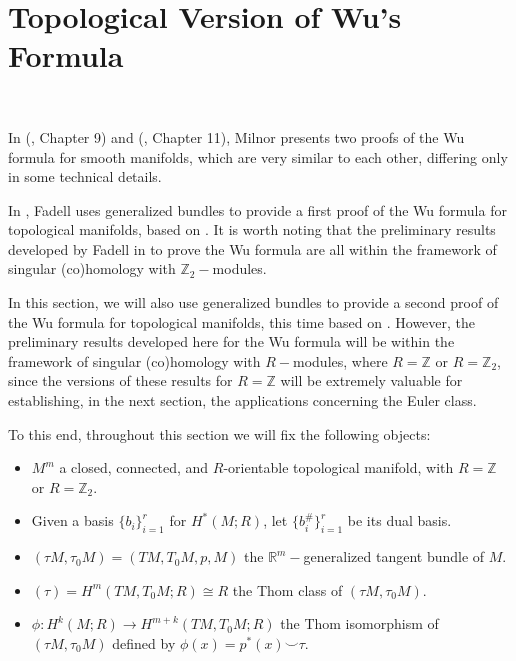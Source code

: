 \documentclass[12pt,oneside]{book}
\newcommand{\R}{\mathbb{R}}
\newcommand{\Z}{\mathbb{Z}}
\newcommand{\ccup}{\smile}
\begin{document}
    \section{Topological Version of Wu's Formula}\label{sec_form_wu}

    \

    In (\cite{milnor_2}, Chapter 9) and (\cite{milnor_1}, Chapter 11), Milnor presents two proofs of the Wu formula for 
    smooth manifolds, which are very similar to each other, differing only in some technical details.

    In \cite{fadell_1}, Fadell uses generalized bundles to provide a first proof of the Wu formula for topological 
    manifolds, based on \cite{milnor_2}. It is worth noting that the preliminary results developed by Fadell 
    in \cite{fadell_1} to prove the Wu formula are all within the framework of singular (co)homology with 
    $\Z_{2}-$modules.

    In this section, we will also use generalized bundles to provide a second proof of the Wu formula for topological manifolds, this time 
    based on \cite{milnor_1}. However, the preliminary results developed here for the Wu formula will be within the framework of singular 
    (co)homology with $R-$modules, where $R=\Z$ or $R=\Z_{2}$, since the versions of these results for $R=\Z$ will be extremely valuable for 
    establishing, in the next section, the applications concerning the Euler class.

    To this end, throughout this section we will fix the following objects:

    \begin{itemize}
    	\item $M^{m}$ a closed, connected, and $R$-orientable topological manifold, with $R=\Z$ or $R=\Z_{2}$.
    	\item Given a basis $\{b_{i}\}_{i=1}^{r}$ for $H^{*}(M;R)$, let $\{b_{i}^{\#}\}_{i=1}^{r}$ be its dual basis.
    	\item $(\tau M,\tau_{0}M)=(TM,T_{0}M,p,M)$ the $\R^{m}-$generalized tangent bundle of $M$.
    	\item $(\tau)=H^{m}(TM,T_{0}M;R)\cong R$ the Thom class of $(\tau M,\tau_{0}M)$.
    	\item $\phi:H^{k}(M;R)\to H^{m+k}(TM,T_{0}M;R)$ the Thom isomorphism of $(\tau M,\tau_{0}M)$ defined by 
        $\phi(x)=p^{*}(x)\ccup \tau$.
    \end{itemize}
\end{document}

